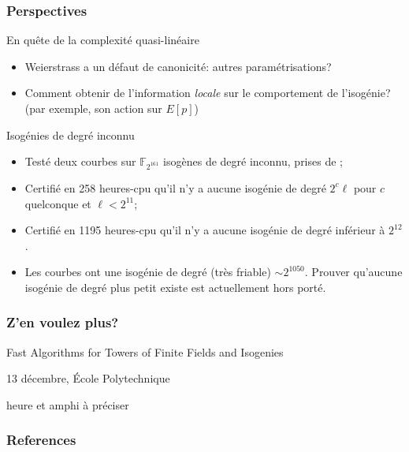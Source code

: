 \documentclass[10pt]{beamer}
\newcommand{\F}{\mathbb{F}}  %
\newcommand{\0}{\mathcal{O}}  %
\begin{document}
\begin{frame}
  \frametitle{Perspectives}
  
  \begin{block}{En quête de la complexité quasi-linéaire}
    \begin{itemize}
    \item Weierstrass a un défaut de canonicité: autres paramétrisations?
    \item Comment obtenir de l'information \emph{locale} sur le
      comportement de l'isogénie? (par exemple, son action sur $E[p]$)
    \end{itemize}
  \end{block}

  \begin{block}{Isogénies de degré inconnu}
    \begin{itemize}
    \item Testé deux courbes sur $\F_{2^{161}}$ isogènes de degré
      inconnu, prises de \cite{teske06};
    \item Certifié en 258 heures-cpu qu'il n'y a aucune isogénie de degré
      $2^c\ell$ pour $c$ quelconque et $\ell<2^{11}$;
    \item Certifié en 1195 heures-cpu qu'il n'y a aucune isogénie de
      degré inférieur à $2^{12}$.
    \item Les courbes ont une isogénie de degré (très friable) $\sim
      2^{1050}$. Prouver qu'aucune isogénie de degré plus petit existe
      est actuellement hors porté.
    \end{itemize}
  \end{block}
\end{frame}


\begin{frame}
  \frametitle{Z'en voulez plus?}
  
  \begin{center}
    \Large Fast Algorithms for Towers of Finite Fields and Isogenies

    \bigskip

    \large 13 décembre, École Polytechnique

    \normalsize heure et amphi à préciser
  \end{center}
\end{frame}


\begin{frame}[allowframebreaks]
  \frametitle{References}


  \beamertemplatebookbibitems
  \printbibliography[filter=books]
  \beamertemplatearticlebibitems
  \printbibliography[filter=articles]
\end{frame}
\end{document}
